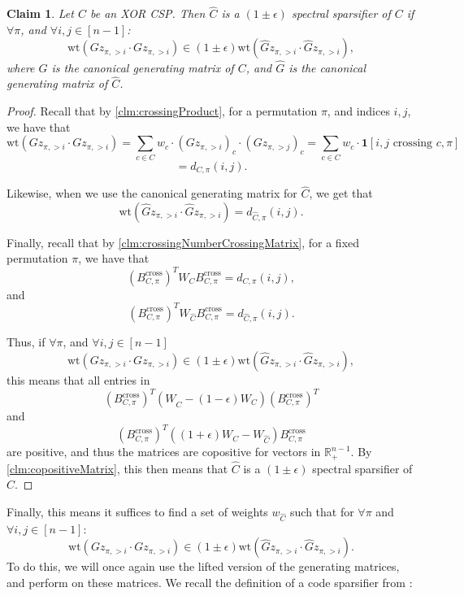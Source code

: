 \documentclass[11pt]{article}
\newtheorem{claim}[theorem]{Claim}
\theoremstyle{definition}
\newcommand{\R}{\mathbb{R}}
\newcommand{\eps}{\epsilon}
\newcommand{\wt}{\mathrm{wt}}
\begin{document}
\begin{claim}\label{clm:preserveAndWeights}
	Let $C$ be an XOR CSP. Then $\hat{C}$ is a $(1 \pm \eps)$ spectral sparsifier of $C$ if $\forall \pi$, and $\forall i, j \in [n-1]$:
	\[
	\wt(Gz_{\pi, > i} \cdot Gz_{\pi, > i}) \in (1 \pm \eps) \wt(\hat{G}z_{\pi, > i} \cdot \hat{G}z_{\pi, > i}),
	\]
	where $G$ is the canonical generating matrix of $C$, and $\hat{G}$ is the canonical generating matrix of $\hat{C}$.
\end{claim}

\begin{proof}
	Recall that by \cref{clm:crossingProduct}, for a permutation $\pi$, and indices $i, j$, we have that 
	\[
	\wt(Gz_{\pi, > i} \cdot Gz_{\pi, > i}) = \sum_{c \in C} w_c \cdot 
	(G z_{\pi, > i})_c \cdot (G z_{\pi, > j})_c = \sum_{c \in C} w_c \cdot \mathbf{1}[i,j \text{ crossing } c, \pi] 
	\]
	\[
	= d_{C, \pi}(i,j). 
	\]
	
	Likewise, when we use the canonical generating matrix for $\hat{C}$, we get that 
	\[
	\wt(\hat{G}z_{\pi, > i} \cdot \hat{G}z_{\pi, > i}) = d_{\hat{C}, \pi}(i,j).
	\]
	
	Finally, recall that by \cref{clm:crossingNumberCrossingMatrix}, for a fixed permutation $\pi$, we have that 
	\[
	(B^{\text{cross}}_{C, \pi})^T W_C B^{\text{cross}}_{C, \pi} = d_{C, \pi}(i,j),
	\]
	and 
	\[
	(B^{\text{cross}}_{C, \pi})^T W_{\hat{C}} B^{\text{cross}}_{C, \pi} = d_{\hat{C}, \pi}(i,j).
	\]
	
	Thus, if $\forall \pi$, and $\forall i, j \in [n-1]$
	\[
	\wt(Gz_{\pi, > i} \cdot Gz_{\pi, > i}) \in (1 \pm \eps) \wt(\hat{G}z_{\pi, > i} \cdot \hat{G}z_{\pi, > i}),
	\]
	this means that all entries in 
	\[(B^{\text{cross}}_{C, \pi})^T (W_{\hat{C}} - (1 - \eps)W_C) (B^{\text{cross}}_{C, \pi})^T\]
	and 
	\[
	(B^{\text{cross}}_{C, \pi})^T ((1 + \eps)W_C - W_{\hat{C}} ) B^{\text{cross}}_{C, \pi} 
	\]
	are positive, and thus the matrices are copositive for vectors in $\R^{n-1}_+$. By \cref{clm:copositiveMatrix}, this then means that $\hat{C}$ is a $(1 \pm \eps)$ spectral sparsifier of $C$.
\end{proof}

Finally, this means it suffices to find a set of weights $w_{\hat{C}}$ such that for $\forall \pi$ and $\forall i, j \in [n-1]$:
\[
\wt(Gz_{\pi, > i} \cdot Gz_{\pi, > i}) \in (1 \pm \eps) \wt(\hat{G}z_{\pi, > i} \cdot \hat{G}z_{\pi, > i}).
\]
To do this, we will once again use the lifted version of the generating matrices, and perform  on these matrices. We recall the definition of a code sparsifier from \cite{KPS24}:
\end{document}

